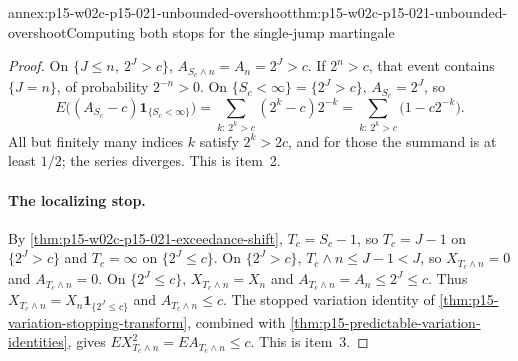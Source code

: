 \begin{annexitem}{annex:p15-w02c-p15-021-unbounded-overshoot}{thm:p15-w02c-p15-021-unbounded-overshoot}{Computing both stops for the single-jump martingale}
\begin{proof}
On \(\{J\leq n,\ 2^J>c\}\), \(A_{S_c\wedge n}=A_n=2^J>c\). If
\(2^n>c\), that event contains \(\{J=n\}\), of probability
\(2^{-n}>0\). On \(\{S_c<\infty\}=\{2^J>c\}\), \(A_{S_c}=2^J\), so
\[
 E\bigl((A_{S_c}-c)\mathbf1_{\{S_c<\infty\}}\bigr)
   =\sum_{k:\,2^k>c}(2^k-c)2^{-k}
   =\sum_{k:\,2^k>c}\bigl(1-c2^{-k}\bigr).
\]
All but finitely many indices \(k\) satisfy \(2^k>2c\), and for those
the summand is at least \(1/2\); the series diverges. This is item~2.

\paragraph{The localizing stop.}
By \cref{thm:p15-w02c-p15-021-exceedance-shift}, \(T_c=S_c-1\), so
\(T_c=J-1\) on \(\{2^J>c\}\) and \(T_c=\infty\) on \(\{2^J\leq c\}\).
On \(\{2^J>c\}\), \(T_c\wedge n\leq J-1<J\), so
\(X_{T_c\wedge n}=0\) and \(A_{T_c\wedge n}=0\). On \(\{2^J\leq c\}\),
\(X_{T_c\wedge n}=X_n\) and \(A_{T_c\wedge n}=A_n\leq2^J\leq c\). Thus
\(X_{T_c\wedge n}=X_n\mathbf1_{\{2^J\leq c\}}\) and
\(A_{T_c\wedge n}\leq c\). The stopped variation identity of
\cref{thm:p15-variation-stopping-transform}, combined with
\cref{thm:p15-predictable-variation-identities}, gives
\(EX_{T_c\wedge n}^2=EA_{T_c\wedge n}\leq c\). This is item~3.
\end{proof}
\end{annexitem}
